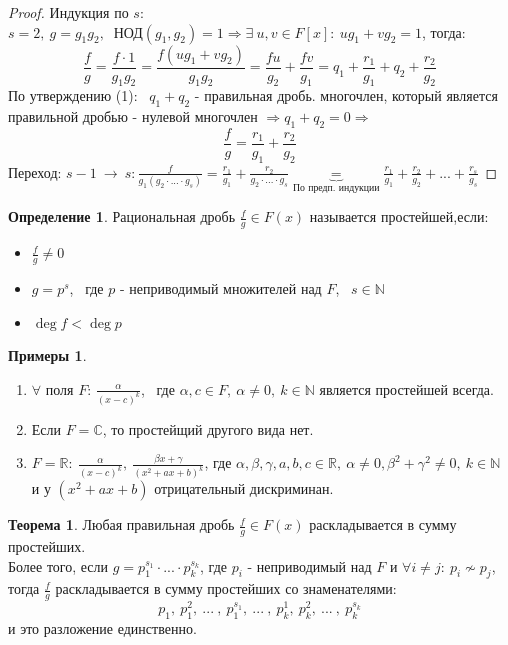 \documentclass[a4paper, 12pt]{article}
\newcommand{\R}{\mathbb R}
\newcommand{\N}{\mathbb N}
\newcommand\tab[1][.5cm]{\hspace*{#1}}
\theoremstyle{definition}
\newtheorem*{definition}{Определение}
\newtheorem*{theorem}{Теорема}
\newtheorem*{example}{Примеры}
\begin{document}
  \begin{proof}
    Индукция по $s$:\\
    $s=2, \ g = g_1g_2, \ $ НОД$(g_1, g_2)=1 \Longrightarrow \exists \ u, v \in F[x]: \ ug_1 + vg_2 = 1$, тогда:
    $$\frac{f}{g} = \frac{f\cdot 1}{g_1g_2} = \frac{f(ug_1 + vg_2)}{g_1g_2} = \frac{fu}{g_2} + \frac{fv}{g_1} = q_1 + \frac{r_1}{g_1} + q_2 + \frac{r_2}{g_2}$$
    По утверждению (1): \ $q_1 + q_2$ - правильная дробь. многочлен, который является правильной дробью - нулевой многочлен  $\Longrightarrow q_1 + q_2 = 0 \Longrightarrow$ 
    $$\frac{f}{g} =\frac{r_1}{g_1} + \frac{r_2}{g_2}$$
    Переход: $s-1 \ \to \ s: \frac{f}{g_1(g_2\cdot ... \cdot g_s)} = \frac{r_1}{g_1} + \frac{r_2}{g_2\cdot ... \cdot g_s} \underbrace{=}_{\text{По предп. индукции}} \frac{r_1}{g_1} + \frac{r_2}{g_2} + ... + \frac{r_s}{g_s}$
  \end{proof}
  \begin{definition}
    Рациональная дробь $\frac{f}{g}\in F(x)$ называется простейшей,если:
    \begin{itemize}
      \item[1) \ ] $\frac{f}{g} \neq 0$
      \item[2) \ ] $g = p^s$, \ где $p$ - неприводимый множителей над $F$, \ $s \in \N$
      \item[3) \ ] $\deg f < \deg p$ 
    \end{itemize}
  \end{definition}
  \begin{example}\tab
    \begin{enumerate}
      \item $\forall$ поля $F$: $\frac{\alpha}{(x-c)^k}$, \ где $\alpha, c \in F, \ \alpha\neq 0, \ k \in \N$ является простейшей всегда.
      \item Если $F = \mathbb{C}$, то простейщий другого вида нет.
      \item $F = \R: \ \frac{\alpha}{(x-c)^k}, \ \frac{\beta x + \gamma}{(x^2+ax+b)^k}$, где $\alpha, \beta, \gamma, a, b, c \in \R, \ \alpha \neq 0, \beta^2 + \gamma^2\neq 0, \ k \in \N$ и у $(x^2+ax+b)$ отрицательный дискриминан.   
    \end{enumerate}
  \end{example}
  \begin{theorem}
    Любая правильная дробь $\frac{f}{g} \in F(x)$ раскладывается в сумму простейших.\\
    Более того, если $g = p_1^{s_1}\cdot ... \cdot p_k^{s_k}$, где $p_i$ - неприводимый над $F$ и $\forall i \neq j: \ p_i \not \sim p_j$, тогда $\frac{f}{g}$ раскладывается в сумму простейших со знаменателями: $$p_1, \  p_1^2, \ ... \ , \ p_1^{s_1}, \ ... \ , \ p_k^1, \ p_k^2, \ ... \ , \ p_k^{s_k}$$
    и это разложение единственно.       
  \end{theorem}
\end{document}
